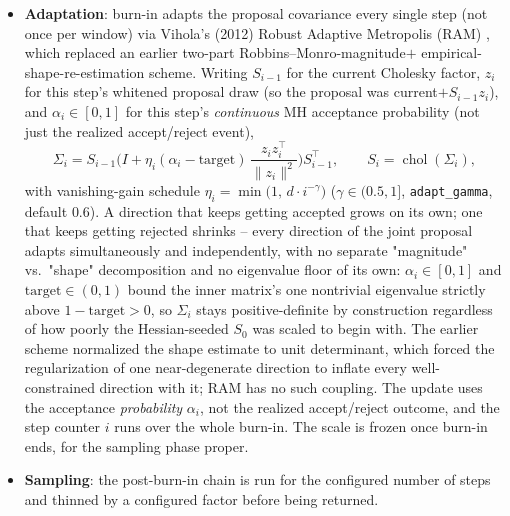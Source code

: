 \documentclass[11pt]{article}
\newcommand{\code}[1]{\texttt{#1}}
\begin{document}
\begin{itemize}
    Even restricted to \code{diff\_params}, this per-lineout Hessian
    (\code{LossFunction.h\_loss\_wrt\_params\_per\_lineout}) is assembled with the same
    low-memory, one-leaf-at-a-time \code{jax.lax.map} sweep \S\ref{sec:laplace} uses, for
    the same peak-memory and compile-time reasons documented there. A fit's lineouts are
    also split across many fit-batches, and \code{run\_mcmc\_for\_fit\_batches} vmaps the
    rest of this sampler across all of them at once for one shared compile -- but this
    step-scale seed (and, when applicable, the block-partition decision below) is computed
    sequentially, one fit-batch at a time (\code{\_seed\_step\_scale}, itself jit-compiled
    so the loop still only compiles once), \emph{before} that vmap: fusing it into the
    fit-batch vmap has been observed to multiply its memory cost by the fit-batch count.
  \item \textbf{Adaptation}: burn-in adapts the proposal covariance every single step (not
    once per window) via Vihola's (2012) Robust Adaptive Metropolis (RAM)
    \cite{vihola2012}, which replaced an earlier two-part Robbins--Monro-magnitude$+$
    empirical-shape-re-estimation scheme. Writing $S_{i-1}$ for the current Cholesky
    factor, $z_i$ for this step's whitened proposal draw (so the proposal was
    current$+S_{i-1}z_i$), and $\alpha_i\in[0,1]$ for this step's \emph{continuous} MH
    acceptance probability (not just the realized accept/reject event),
    \begin{equation}
      \Sigma_i = S_{i-1}\Big(I+\eta_i(\alpha_i-\text{target})\,
      \frac{z_iz_i^\top}{\lVert z_i\rVert^2}\Big)S_{i-1}^\top, \qquad
      S_i=\operatorname{chol}(\Sigma_i),
    \end{equation}
    with vanishing-gain schedule $\eta_i=\min\!\big(1,\,d\cdot i^{-\gamma}\big)$
    ($\gamma\in(0.5,1]$, \code{adapt\_gamma}, default $0.6$). A direction that keeps
    getting accepted grows on its own; one that keeps getting rejected shrinks -- every
    direction of the joint proposal adapts simultaneously and independently, with no
    separate "magnitude" vs.\ "shape" decomposition and no eigenvalue floor of its own:
    $\alpha_i\in[0,1]$ and $\text{target}\in(0,1)$ bound the inner matrix's one nontrivial
    eigenvalue strictly above $1-\text{target}>0$, so $\Sigma_i$ stays positive-definite by
    construction regardless of how poorly the Hessian-seeded $S_0$ was scaled to begin
    with. The earlier scheme normalized the shape estimate to unit determinant, which
    forced the regularization of one near-degenerate direction to inflate every
    well-constrained direction with it; RAM has no such coupling. The update uses the
    acceptance \emph{probability} $\alpha_i$, not the realized accept/reject outcome, and
    the step counter $i$ runs over the whole burn-in. The scale is frozen once burn-in
    ends, for the sampling phase proper.
  \item \textbf{Sampling}: the post-burn-in chain is run for the configured number of
    steps and thinned by a configured factor before being returned.
\end{itemize}
\end{document}
